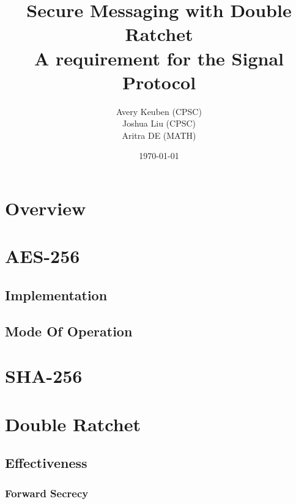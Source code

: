 

\title{Secure Messaging with Double Ratchet\\ A requirement for the Signal Protocol}
\author{Avery Keuben (CPSC)\\ Joshua Liu (CPSC)\\ Aritra DE (MATH)}
\date{\today}
  


\maketitle

\newpage

\section{Overview}


\section{AES-256}


\subsection{Implementation}


\subsection{Mode Of Operation}


\section{SHA-256}





\section{Double Ratchet}


\subsection{Effectiveness}


\subsubsection{Forward Secrecy}



